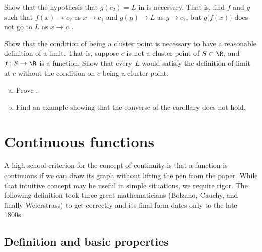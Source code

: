 \begin{exercise}[Challenging] \label{exercise:contlimitbadcomposition}
Show that the hypothesis that $g(c_2) = L$ in
 is necessary.  That is, find $f$
and $g$ such that $f(x) \to c_2$ as $x \to c_1$ and
$g(y) \to L$ as $y \to c_2$, but $g\bigl(f(x)\bigr)$ does not go to $L$
as $x \to c_1$.
\end{exercise}

\begin{exercise}
Show that the condition of being a cluster point is necessary to have a
reasonable definition of a limit.  That is, suppose $c$ is not a cluster
point of $S \subset \R$, and $f \colon S \to \R$ is a function.  Show that
every $L$ would satisfy the definition of limit at $c$ without the condition
on $c$ being a cluster point.
\end{exercise}

\begin{exercise}
\leavevmode
\begin{enumerate}[a)]
\item
Prove .
\item
Find an example showing that the converse of
the corollary does not hold.
\end{enumerate}
\end{exercise}


\sectionnewpage
\section{Continuous functions}
\label{sec:cont}



A high-school criterion for the concept of continuity
is that a function is continuous if
we can draw its graph without lifting the pen from the paper.  While that
intuitive concept may be useful in simple situations, we require
rigor.  The following definition took three great mathematicians
(Bolzano, Cauchy, and finally Weierstrass) to get correctly and its final
form dates only to the late 1800s.

\subsection{Definition and basic properties}

